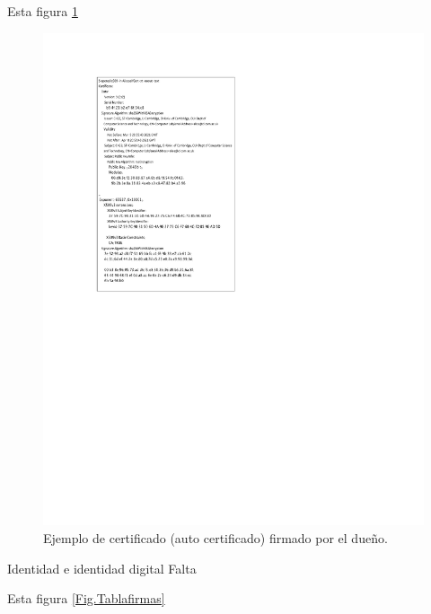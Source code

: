 \documentclass[12pt]{report} %
\begin{document}
\begin{itemize}
Esta figura \ref{Fig.ejemplocertificadofirmadodueno}

\begin{figure}
\centering
\includegraphics[width=0.85\columnwidth]{imagenes/certfirmadodueno.pdf}
\caption{Ejemplo de certificado (auto certificado) firmado por el dueño.}
\label{Fig.ejemplocertificadofirmadodueno}
\end{figure} 

Identidad e identidad digital
Falta

Esta figura \ref{Fig.Tablafirmas}


\end{itemize}
\end{document}
